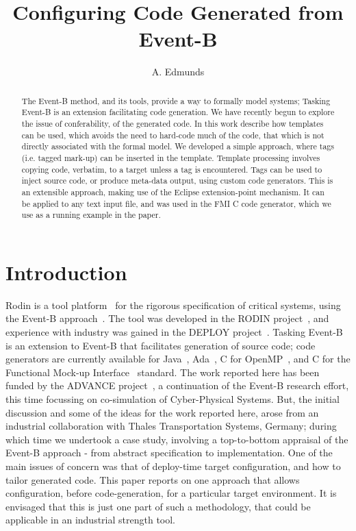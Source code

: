 \documentclass{llncs}%
\begin{document}
%
\title{Configuring Code Generated from Event-B}

\author{A. Edmunds}


\maketitle
%
\begin{abstract}
The Event-B method, and  its tools, provide a way to formally model systems; Tasking Event-B is an extension facilitating code generation.  We have recently begun to explore the issue of conferability, of the generated code. In this work describe how templates can be used, which avoids the need to hard-code much of the code, that which is not directly associated with the formal model. We developed a simple approach, where tags (i.e. tagged mark-up) can be inserted in the template. Template processing involves copying code, verbatim, to a target unless a tag is encountered. Tags can be used to inject source code, or produce meta-data output, using custom code generators. This is an extensible approach, making use of the Eclipse extension-point mechanism. It can be applied to any text input file, and was used in the FMI C code generator, which we use as a running example in the paper. 
 \end{abstract}
%
%
\section{Introduction}
%
Rodin is a  tool platform~\cite{abrial10rodin} for the rigorous specification of critical systems, using the Event-B approach~\cite{ABR10}. The tool was developed in the RODIN project~\cite{RodinTool}, and experience with industry was gained in the DEPLOY project~\cite{DEPLOY}. Tasking Event-B~\cite{Edmunds2009,Edmunds2008,ae2011a,ae2012b} is an extension to Event-B that facilitates generation of source code; code generators are currently available for Java~\cite{JavaSpec}, Ada~\cite{ada2005}, C for OpenMP~\cite{openmp}, and C for the Functional Mock-up Interface~\cite{FMISTD} standard. The work reported here has been funded by the ADVANCE project~\cite{advance}, a continuation of the Event-B research effort, this time focussing on co-simulation of Cyber-Physical Systems. But, the initial discussion and some of the ideas for the work reported here, arose from an industrial collaboration with Thales Transportation Systems, Germany; during which time we undertook a case study, involving a top-to-bottom appraisal of the Event-B approach - from abstract specification to implementation. One of the main issues of concern was that of deploy-time target configuration, and how to tailor generated code. This paper reports on one approach that allows configuration, before code-generation, for a particular target environment. It is envisaged that this is just one part of such a methodology, that could be applicable in an industrial strength tool.   
\end{document}
